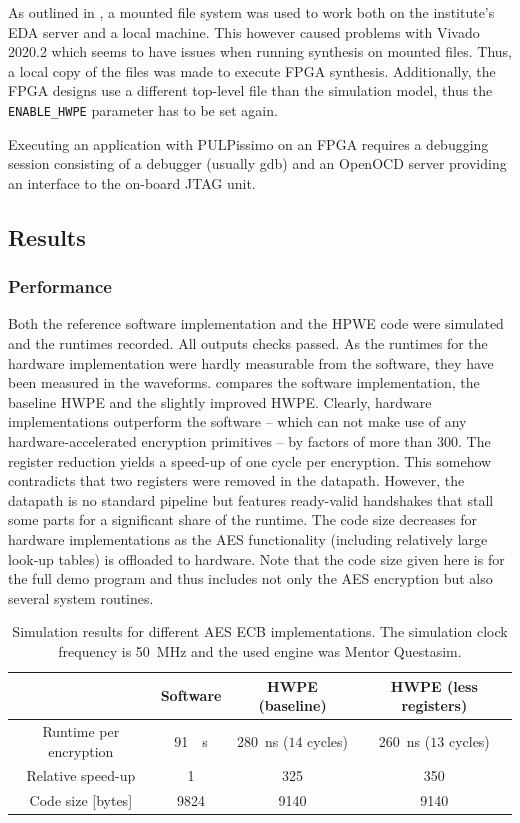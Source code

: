 \documentclass[a4paper, 12pt]{article}
\begin{document}
As outlined in , a mounted file system was used to work both on the institute's EDA server and a local machine. This however caused problems with Vivado 2020.2 which seems to have issues when running synthesis on mounted files. Thus, a local copy of the files was made to execute FPGA synthesis. Additionally, the FPGA designs use a different top-level file than the simulation model, thus the \verb|ENABLE_HWPE| parameter has to be set again.

Executing an application with PULPissimo on an FPGA requires a debugging session consisting of a debugger (usually gdb) and an OpenOCD server providing an interface to the on-board JTAG unit. 

\subsection{Results} \label{sec:improvements:results}

\subsubsection{Performance}

Both the reference software implementation and the HPWE code were simulated and the runtimes recorded. All outputs checks passed. As the runtimes for the hardware implementation were hardly measurable from the software, they have been measured in the waveforms.  compares the software implementation, the baseline HWPE and the slightly improved HWPE. Clearly, hardware implementations outperform the software -- which can not make use of any hardware-accelerated encryption primitives -- by factors of more than $300$. The register reduction yields a speed-up of one cycle per encryption. This somehow contradicts that two registers were removed in the datapath. However, the datapath is no standard pipeline but features ready-valid handshakes that stall some parts for a significant share of the runtime. The code size decreases for hardware implementations as the AES functionality (including relatively large look-up tables) is offloaded to hardware. Note that the code size given here is for the full demo program and thus includes not only the AES encryption but also several system routines.

\begin{table}[h]
    \centering
    \begin{tabular}{c|c c c}
        \toprule
         &  Software & HWPE (baseline) & HWPE (less registers) \\
        \midrule
		Runtime per encryption & \SI{91}{\mu s} & \SI{280}{ns} ($14$ cycles) & \SI{260}{ns} ($13$ cycles) \\
		Relative speed-up & 1 & 325 & 350 \\
		Code size [bytes] & 9824 & 9140 & 9140\\
        \bottomrule
    \end{tabular}
	\label{tab:results-ecb}
	\caption{Simulation results for different AES ECB implementations. The simulation clock frequency is \SI{50}{MHz} and the used engine was Mentor Questasim.}
\end{table}
\end{document}
